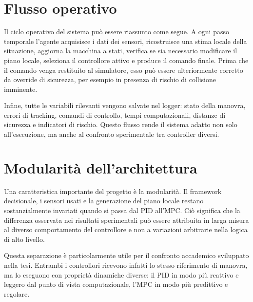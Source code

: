 \section{Flusso operativo}

Il ciclo operativo del sistema può essere riassunto come segue. A ogni passo temporale l'agente acquisisce i dati dei sensori, ricostruisce una stima locale della situazione, aggiorna la macchina a stati, verifica se sia necessario modificare il piano locale, seleziona il controllore attivo e produce il comando finale. Prima che il comando venga restituito al simulatore, esso può essere ulteriormente corretto da override di sicurezza, per esempio in presenza di rischio di collisione imminente.

Infine, tutte le variabili rilevanti vengono salvate nel logger: stato della manovra, errori di tracking, comandi di controllo, tempi computazionali, distanze di sicurezza e indicatori di rischio. Questo flusso rende il sistema adatto non solo all'esecuzione, ma anche al confronto sperimentale tra controller diversi.

\section{Modularità dell'architettura}

Una caratteristica importante del progetto è la modularità. Il framework decisionale, i sensori usati e la generazione del piano locale restano sostanzialmente invariati quando si passa dal PID all'MPC. Ciò significa che la differenza osservata nei risultati sperimentali può essere attribuita in larga misura al diverso comportamento del controllore e non a variazioni arbitrarie nella logica di alto livello.

Questa separazione è particolarmente utile per il confronto accademico sviluppato nella tesi. Entrambi i controllori ricevono infatti lo stesso riferimento di manovra, ma lo eseguono con proprietà dinamiche diverse: il PID in modo più reattivo e leggero dal punto di vista computazionale, l'MPC in modo più predittivo e regolare.

